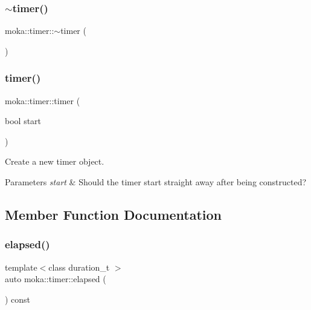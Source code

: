 \subsubsection{\texorpdfstring{$\sim$timer()}{~timer()}}
{\footnotesize\ttfamily moka\+::timer\+::$\sim$timer (\begin{DoxyParamCaption}{ }\end{DoxyParamCaption})}

\mbox{\label{classmoka_1_1timer_abfc5a3eaf59b009613f7e763b5d89da9}} 
\subsubsection{\texorpdfstring{timer()}{timer()}\hspace{0.1cm}{\footnotesize\ttfamily [3/3]}}
{\footnotesize\ttfamily moka\+::timer\+::timer (\begin{DoxyParamCaption}\item[{bool}]{start }\end{DoxyParamCaption})\hspace{0.3cm}{\ttfamily [explicit]}}



Create a new timer object. 


\begin{DoxyParams}{Parameters}
{\em start} & Should the timer start straight away after being constructed? \\
\hline
\end{DoxyParams}


\subsection{Member Function Documentation}
\mbox{\label{classmoka_1_1timer_a077bf849a8a901506c971a5f1287abea}} 
\subsubsection{\texorpdfstring{elapsed()}{elapsed()}}
{\footnotesize\ttfamily template$<$class duration\+\_\+t $>$ \\
auto moka\+::timer\+::elapsed (\begin{DoxyParamCaption}{ }\end{DoxyParamCaption}) const}



